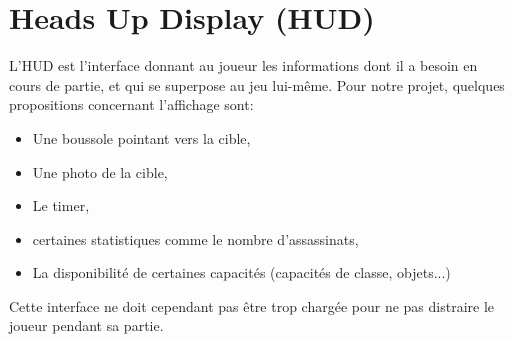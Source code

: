 \documentclass[../doc.tex]{subfiles}
\begin{document}
\section{Heads Up Display (HUD)}
L'HUD est l'interface donnant au joueur les informations dont il a besoin en cours de partie, et qui se superpose
au jeu lui-même.
Pour notre projet, quelques propositions concernant l'affichage sont:
\begin{itemize}
    \item Une boussole pointant vers la cible,
    \item Une photo de la cible,
    \item Le timer,
    \item certaines statistiques comme le nombre d'assassinats,
    \item La disponibilité de certaines capacités (capacités de classe, objets...)
\end{itemize}


Cette interface ne doit cependant pas être trop chargée pour ne pas distraire le joueur pendant sa partie.
\end{document}
